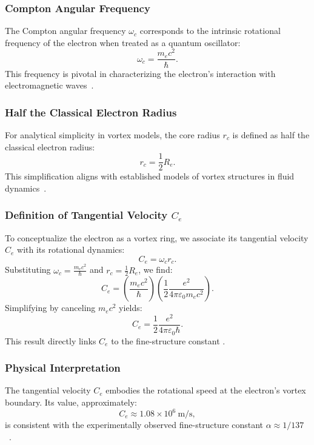 \subsubsection{Compton Angular Frequency}
The Compton angular frequency $\omega_c$ corresponds to the intrinsic rotational frequency of the electron when treated as a quantum oscillator:
\begin{equation}
    \omega_c = \frac{m_e c^2}{\hbar}.
\end{equation}
This frequency is pivotal in characterizing the electron’s interaction with electromagnetic waves~\cite{kelvin1867}.

\subsubsection{Half the Classical Electron Radius}
For analytical simplicity in vortex models, the core radius $r_c$ is defined as half the classical electron radius:
\begin{equation}
    r_c = \frac{1}{2} R_e.
\end{equation}
This simplification aligns with established models of vortex structures in fluid dynamics~\cite{kleckner2013}.

\subsubsection{Definition of Tangential Velocity $C_e$}
To conceptualize the electron as a vortex ring, we associate its tangential velocity $C_e$ with its rotational dynamics:
\begin{equation}
    C_e = \omega_c r_c.
\end{equation}
Substituting $\omega_c = \frac{m_e c^2}{\hbar}$ and $r_c = \frac{1}{2} R_e$, we find:
\begin{equation}
    C_e = \left( \frac{m_e c^2}{\hbar} \right) \left( \frac{1}{2} \frac{e^2}{4\pi \varepsilon_0 m_e c^2} \right).\label{eq:equation}
\end{equation}
Simplifying by canceling $m_e c^2$ yields:
\begin{equation}
    C_e = \frac{1}{2} \frac{e^2}{4\pi \varepsilon_0 \hbar}.
\end{equation}
This result directly links $C_e$ to the fine-structure constant \cite{vinen2024}.

\subsubsection{Physical Interpretation}
The tangential velocity $C_e$ embodies the rotational speed at the electron’s vortex boundary. Its value, approximately:
\begin{equation}
    C_e \approx 1.08 \times 10^6 \ \text{m/s},
\end{equation}
is consistent with the experimentally observed fine-structure constant $\alpha \approx 1/137$~\cite{ricca1998}.

